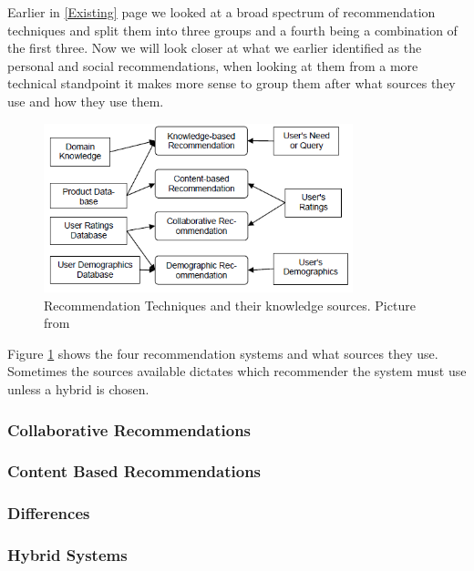 Earlier in \ref{Existing} page \pageref{Existing} we looked at a broad spectrum of recommendation techniques and  split them into three groups and a fourth being a combination of the first three. Now we will look closer at what we earlier identified as the personal and social recommendations, when looking at them from a more technical standpoint it makes more sense to group them after what sources they use and how they use them.

\begin{figure}[H]
\centering
\includegraphics[width=0.8\textwidth]{Images/RecTypes.png}
\caption{Recommendation Techniques and their knowledge sources. Picture from \cite{TheAdaptiveWeb}}
\label{RecTypes}
\end{figure}

Figure \ref{RecTypes} shows the four recommendation systems and what sources they use. Sometimes the sources available dictates which recommender the system must use unless a hybrid is chosen. 


\subsubsection{Collaborative Recommendations} 
\label{Collaborative} 

\subsubsection{Content Based Recommendations} 
\label{ContentBased} 

\subsubsection{Differences}
\label{Differences} 

\subsubsection{Hybrid Systems} 
\label{Hybrid} 
